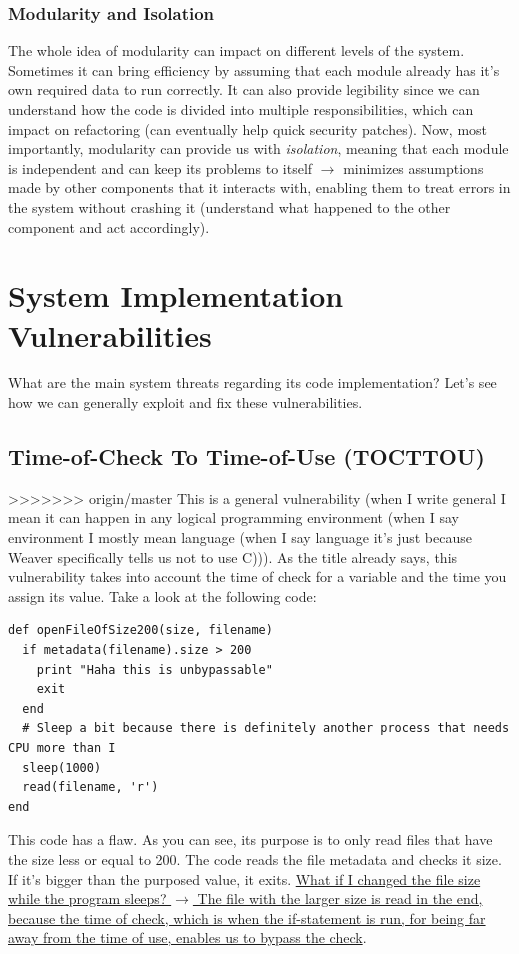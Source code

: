 \documentclass[11pt]{article}
\begin{document}
\subsubsection{Modularity and Isolation}
\label{sec:org5619b78}
The whole idea of modularity can impact on different levels of the system. Sometimes it can bring efficiency by assuming that each module already has it's own required data to run correctly. It can also provide legibility since we can understand how the code is divided into multiple responsibilities, which can impact on refactoring (can eventually help quick security patches). Now, most importantly, modularity can provide us with \emph{isolation}, meaning that each module is independent and can keep its problems to itself \(\to\) minimizes assumptions made by other components that it interacts with, enabling them to treat errors in the system without crashing it (understand what happened to the other component and act accordingly).

\section{System Implementation Vulnerabilities}
\label{sec:org452e455}
What are the main system threats regarding its code implementation? Let's see how we can generally exploit and fix these vulnerabilities.
\subsection{Time-of-Check To Time-of-Use (TOCTTOU)}
\label{sec:orgdb6e980}
>>>>>>> origin/master
This is a general vulnerability (when I write general I mean it can happen in any logical programming environment (when I say environment I mostly mean language (when I say language it's just because Weaver specifically tells us not to use C))). As the title already says, this vulnerability takes into account the time of check for a variable and the time you assign its value. Take a look at the following code:

\begin{verbatim}
def openFileOfSize200(size, filename)
  if metadata(filename).size > 200
    print "Haha this is unbypassable"
    exit
  end
  # Sleep a bit because there is definitely another process that needs CPU more than I
  sleep(1000)
  read(filename, 'r')
end
\end{verbatim}

This code has a flaw. As you can see, its purpose is to only read files that have the size less or equal to 200. The code reads the file metadata and checks it size. If it's bigger than the purposed value, it exits. \uline{What if I changed the file size while the program sleeps? \(\to\) The file with the larger size is read in the end, because the time of check, which is when the if-statement is run, for being far away from the time of use, enables us to bypass the check}.
\end{document}

